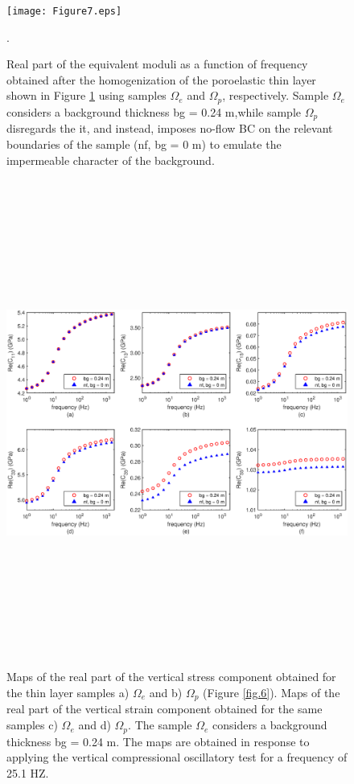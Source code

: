 \documentclass[draft]{agujournal2019}
\begin{document}
\begin{figure}[!ht]
\centering
        \texttt{[image: Figure7.eps]}
\caption{Real part of the equivalent moduli as a function of frequency obtained after the homogenization of the poroelastic thin layer shown in Figure \ref{fig.7} using samples $\Omega_e$ and  $\Omega_p$, respectively. Sample $\Omega_e$ considers a background thickness bg = 0.24 m,while sample $\Omega_p$ disregards the it, and instead, imposes no-flow BC on the relevant boundaries of the sample (nf, bg = 0 m) to emulate the impermeable character of the background.}. 

\label{fig.7}
\end{figure}

\begin{figure}[!ht]
\centering
        \includegraphics[width= 140mm, height=160mm]{Figure8.eps}
\caption{Maps of the real part of the vertical stress component obtained for the thin layer samples a) $\Omega_e$  and b) $\Omega_p$ (Figure \ref{fig.6}). Maps of the real part of the vertical strain component obtained for the same samples c) $\Omega_e$  and d) $\Omega_p$. 
The sample $\Omega_e$ considers a background thickness bg = 0.24 m.
The maps are obtained in response to applying the vertical compressional oscillatory test for a frequency of 25.1 HZ.}
\label{fig.8}
\end{figure}
\end{document}
